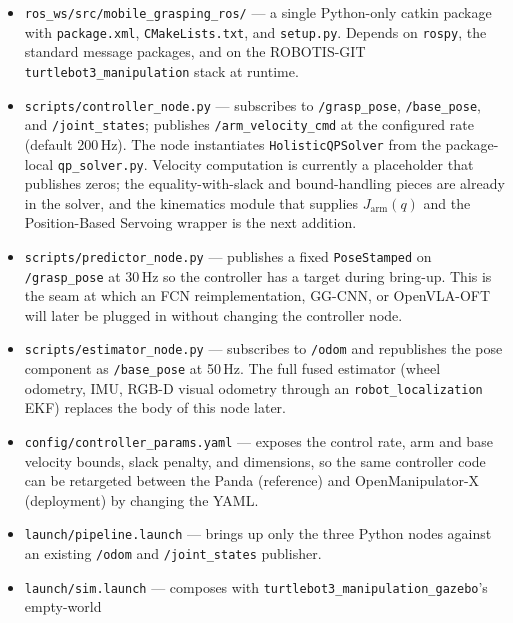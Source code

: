 \documentclass[11pt]{article}
\begin{document}
\begin{itemize}[noitemsep]
  \item \texttt{ros\_ws/src/mobile\_grasping\_ros/} --- a single
        Python-only catkin package with \texttt{package.xml},
        \texttt{CMakeLists.txt}, and \texttt{setup.py}. Depends on
        \texttt{rospy}, the standard message packages, and on the
        ROBOTIS-GIT \texttt{turtlebot3\_manipulation} stack at
        runtime.
  \item \texttt{scripts/controller\_node.py} --- subscribes to
        \texttt{/grasp\_pose}, \texttt{/base\_pose}, and
        \texttt{/joint\_states}; publishes
        \texttt{/arm\_velocity\_cmd} at the configured rate
        (default 200\,Hz). The node instantiates
        \texttt{HolisticQPSolver} from the package-local
        \texttt{qp\_solver.py}. Velocity computation is currently a
        placeholder that publishes zeros; the equality-with-slack
        and bound-handling pieces are already in the solver, and the
        kinematics module that supplies $J_{\text{arm}}(q)$ and the
        Position-Based Servoing wrapper is the next addition.
  \item \texttt{scripts/predictor\_node.py} --- publishes a fixed
        \texttt{PoseStamped} on \texttt{/grasp\_pose} at 30\,Hz so
        the controller has a target during bring-up. This is the
        seam at which an FCN reimplementation, GG-CNN, or
        OpenVLA-OFT will later be plugged in without changing the
        controller node.
  \item \texttt{scripts/estimator\_node.py} --- subscribes to
        \texttt{/odom} and republishes the pose component as
        \texttt{/base\_pose} at 50\,Hz. The full fused estimator
        (wheel odometry, IMU, RGB-D visual odometry through an
        \texttt{robot\_localization} EKF) replaces the body of this
        node later.
  \item \texttt{config/controller\_params.yaml} --- exposes the
        control rate, arm and base velocity bounds, slack penalty,
        and dimensions, so the same controller code can be
        retargeted between the Panda (reference) and
        OpenManipulator-X (deployment) by changing the YAML.
  \item \texttt{launch/pipeline.launch} --- brings up only the three
        Python nodes against an existing \texttt{/odom} and
        \texttt{/joint\_states} publisher.
  \item \texttt{launch/sim.launch} --- composes with
        \texttt{turtlebot3\_manipulation\_gazebo}'s empty-world

\end{itemize}
\end{document}
